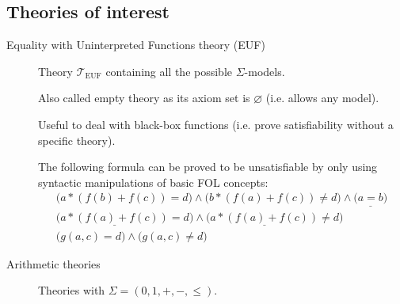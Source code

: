 \subsection{Theories of interest}

\begin{description}
    \item[Equality with Uninterpreted Functions theory (EUF)] 
        Theory $\mathcal{T}_\text{EUF}$ containing all the possible $\Sigma$-models.
        
        \begin{remark}
            Also called empty theory as its axiom set is $\varnothing$ (i.e. allows any model).
        \end{remark}
        
        \begin{remark}
            Useful to deal with black-box functions (i.e. prove satisfiability without a specific theory).
            \begin{example}
                The following formula can be proved to be unsatisfiable by only using syntactic manipulations of basic FOL concepts:
                \begin{gather*}
                    \big( a * (f(b) + f(c)) = d \big) \land \big( b * (f(a) + f(c)) \neq d \big) \land \underline{\big( a = b \big)} \\
                    \big( \underline{a * (f(a) + f(c))} = d \big) \land \big( \underline{a * (f(a) + f(c))} \neq d \big) \\
                    \big( g(a, c) = d \big) \land \big( g(a, c) \neq d \big)
                \end{gather*}
            \end{example}
        \end{remark}


    \item[Arithmetic theories] 
        Theories with $\Sigma = (0, 1, +, -, \leq)$.


\end{description}
